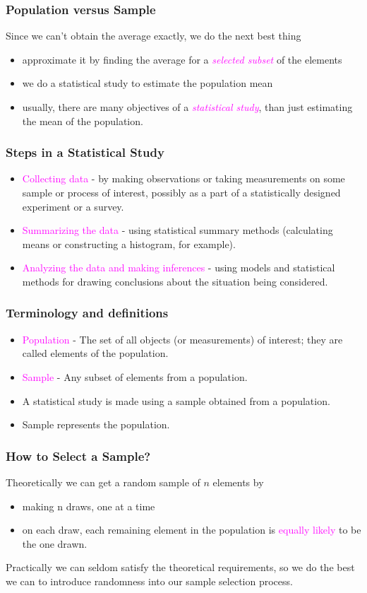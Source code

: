 \documentclass[xcolor=dvipsnames,12pt]{beamer}
\begin{document}
\begin{frame}
\frametitle{Population versus Sample}
Since we can't obtain the average exactly, we do the next best thing
\begin{itemize}
\item approximate it by finding the average for a \textcolor{magenta}{\textit{selected subset}} of 
the elements
\item we do a statistical study to estimate the population mean
\item usually, there are many objectives of a \textcolor{magenta}{\textit{statistical study}}, 
than just estimating the mean of the population.
\end{itemize}
\end{frame}


\begin{frame}
\frametitle{Steps in a Statistical Study}
\begin{itemize}
\item  \textcolor{magenta}{Collecting data} - by making observations or taking 
measurements on some sample or process of interest, possibly 
as a part of a statistically designed experiment or a survey.
\item \textcolor{magenta}{Summarizing the data}  - using statistical summary methods 
(calculating means or constructing a histogram, for example).
\item \textcolor{magenta}{Analyzing the data and making inferences} - using models
and statistical methods for drawing conclusions about the situation 
being considered.
\end{itemize}
\end{frame}


\begin{frame}
\frametitle{{Terminology and definitions}}
\begin{itemize}
\item  \textcolor{magenta}{Population} -  The set of all objects (or measurements) of 
interest; they are called elements of the population.
\item\textcolor{magenta}{Sample} - Any subset of elements from a population.

\item A statistical study is made using a sample obtained from a population.
\item Sample represents the population.
\end{itemize}
\end{frame}


\begin{frame}
\frametitle{How to Select a Sample?}
Theoretically we can get a random sample of $n$ elements by
\begin{itemize}
\item making n draws, one at a time
\item on each draw, each remaining element in the population
is \textcolor{magenta}{equally likely} to be the one drawn. 
\end{itemize}
Practically we can seldom satisfy the theoretical requirements, 
so we do the best we can to introduce randomness into our sample 
selection process. 
\end{frame}
\end{document}
